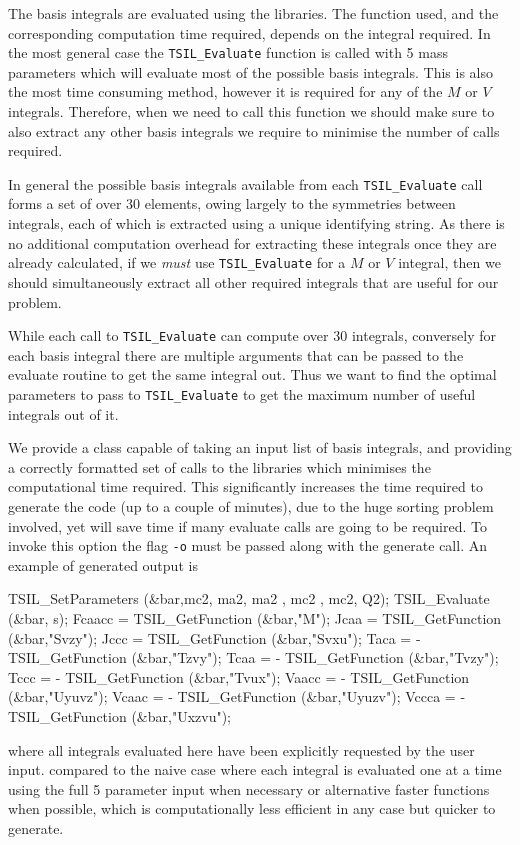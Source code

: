 The basis integrals are evaluated using the \tsil libraries.  The function used, and the corresponding computation time required, depends on the integral required.  In the most general case the \lstinline{TSIL_Evaluate} function is called with 5 mass parameters which will evaluate most of the possible basis integrals.  This is also the most time consuming method, however it is required for any of the $M$ or $V$ integrals.  Therefore, when we need to call this function we should make sure to also extract any other basis integrals we require to minimise the number of calls required.

In general the possible basis integrals available from each \lstinline{TSIL_Evaluate} call forms a set of over 30 elements, owing largely to the symmetries between integrals, each of which is extracted using a unique identifying string.  As there is no additional computation overhead for extracting these integrals once they are already calculated, if we \textit{must} use \lstinline{TSIL_Evaluate} for a $M$ or $V$ integral, then we should simultaneously extract all other required integrals that are useful for our problem.

While each call to \lstinline{TSIL_Evaluate} can compute over 30 integrals, conversely for each basis integral there are multiple arguments that can be passed to the evaluate routine to get the same integral out.  Thus we want to find the optimal parameters to pass to  \lstinline{TSIL_Evaluate} to get the maximum number of useful integrals out of it.

We provide a class capable of taking an input list of basis integrals, and providing a correctly formatted set of calls to the \tsil libraries which minimises the computational time required.  This significantly increases the time required to generate the code (up to a couple of minutes), due to the huge sorting problem involved, yet will save time if many evaluate calls are going to be required.  To invoke this option the flag \lstinline{-o} must be passed along with the generate call.  An example of generated output is

\begin{lstcpp}
TSIL_SetParameters (&bar,mc2, ma2, ma2 , mc2 , mc2, Q2);
TSIL_Evaluate (&bar, s);
Fcaacc =   TSIL_GetFunction (&bar,"M");
Jcaa   =   TSIL_GetFunction (&bar,"Svzy");
Jccc   =   TSIL_GetFunction (&bar,"Svxu");
Taca   = - TSIL_GetFunction (&bar,"Tzvy");
Tcaa   = - TSIL_GetFunction (&bar,"Tvzy");
Tccc   = - TSIL_GetFunction (&bar,"Tvux");
Vaacc  = - TSIL_GetFunction (&bar,"Uyuvz");
Vcaac  = - TSIL_GetFunction (&bar,"Uyuzv");
Vccca  = - TSIL_GetFunction (&bar,"Uxzvu");
\end{lstcpp}
where all integrals evaluated here have been explicitly requested by the user input.
compared to the naive case where each integral is evaluated one at a time using the full 5 parameter input when necessary or alternative faster functions when possible, which is computationally less efficient in any case but quicker to generate.

